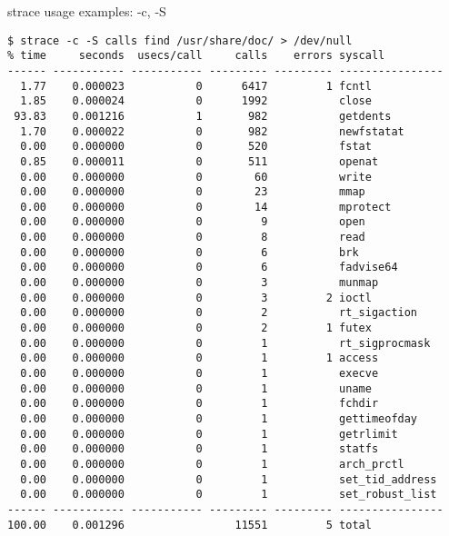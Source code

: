 \documentclass[unicode]{beamer}
\begin{document}
\begin{frame}[fragile]{strace usage examples: -c, -S}
\tiny
\begin{verbatim}
$ strace -c -S calls find /usr/share/doc/ > /dev/null 
% time     seconds  usecs/call     calls    errors syscall
------ ----------- ----------- --------- --------- ----------------
  1.77    0.000023           0      6417         1 fcntl
  1.85    0.000024           0      1992           close
 93.83    0.001216           1       982           getdents
  1.70    0.000022           0       982           newfstatat
  0.00    0.000000           0       520           fstat
  0.85    0.000011           0       511           openat
  0.00    0.000000           0        60           write
  0.00    0.000000           0        23           mmap
  0.00    0.000000           0        14           mprotect
  0.00    0.000000           0         9           open
  0.00    0.000000           0         8           read
  0.00    0.000000           0         6           brk
  0.00    0.000000           0         6           fadvise64
  0.00    0.000000           0         3           munmap
  0.00    0.000000           0         3         2 ioctl
  0.00    0.000000           0         2           rt_sigaction
  0.00    0.000000           0         2         1 futex
  0.00    0.000000           0         1           rt_sigprocmask
  0.00    0.000000           0         1         1 access
  0.00    0.000000           0         1           execve
  0.00    0.000000           0         1           uname
  0.00    0.000000           0         1           fchdir
  0.00    0.000000           0         1           gettimeofday
  0.00    0.000000           0         1           getrlimit
  0.00    0.000000           0         1           statfs
  0.00    0.000000           0         1           arch_prctl
  0.00    0.000000           0         1           set_tid_address
  0.00    0.000000           0         1           set_robust_list
------ ----------- ----------- --------- --------- ----------------
100.00    0.001296                 11551         5 total
\end{verbatim}
\end{frame}
\end{document}
